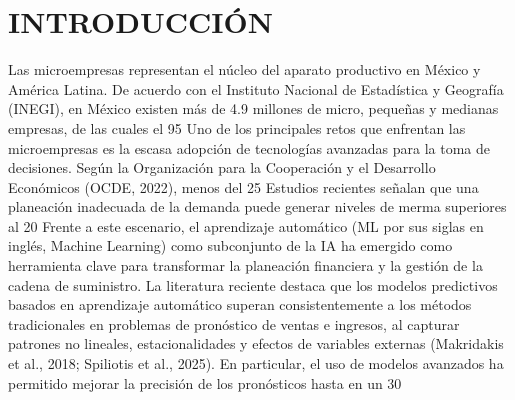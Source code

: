 \documentclass[12pt]{book}
\begin{document}
\chapter{INTRODUCCIÓN}
Las microempresas representan el núcleo del aparato productivo en México y América Latina. De acuerdo con el Instituto Nacional de Estadística y Geografía (INEGI), en México existen más de 4.9 millones de micro, pequeñas y medianas empresas, de las cuales el 95 %
Uno de los principales retos que enfrentan las microempresas es la escasa adopción de tecnologías avanzadas para la toma de decisiones. Según la Organización para la Cooperación y el Desarrollo Económicos (OCDE, 2022), menos del 25 %
Estudios recientes señalan que una planeación inadecuada de la demanda puede generar niveles de merma superiores al 20%
Frente a este escenario, el aprendizaje automático (ML por sus siglas en inglés, Machine Learning) como subconjunto de la IA ha emergido como herramienta clave para transformar la planeación financiera y la gestión de la cadena de suministro. 
La literatura reciente destaca que los modelos predictivos basados en aprendizaje automático superan consistentemente a los métodos tradicionales en problemas de pronóstico de ventas e ingresos, al capturar patrones no lineales, estacionalidades y efectos de variables externas (Makridakis et al., 2018; Spiliotis et al., 2025). En particular, el uso de modelos avanzados ha permitido mejorar la precisión de los pronósticos hasta en un 30%
\end{document}
